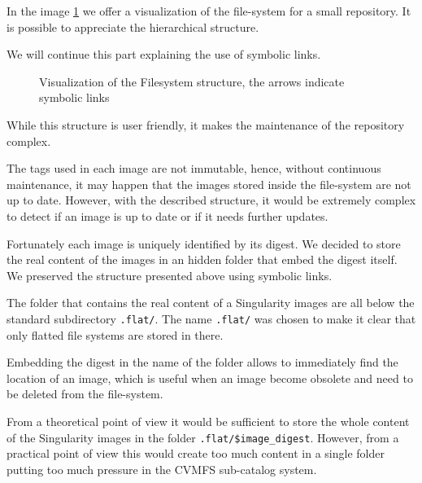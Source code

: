 In the image \ref{fig:simple-fs} we offer a visualization of the file-system for a small repository. It is possible to appreciate the hierarchical structure.

We will continue this part explaining the use of symbolic links.

\begin{figure}
\caption{Visualization of the Filesystem structure, the arrows indicate symbolic links}
\label{fig:simple-fs}
\end{figure}

While this structure is user friendly, it makes the maintenance of the repository complex.

The tags used in each image are not immutable, hence, without continuous maintenance, it may happen that the images stored inside the file-system are not up to date.
However, with the described structure, it would be extremely complex to detect if an image is up to date or if it needs further updates.

Fortunately each image is uniquely identified by its digest.
We decided to store the real content of the images in an hidden folder that embed the digest itself. 
We preserved the structure presented above using symbolic links.

The folder that contains the real content of a Singularity images are all below the standard subdirectory \texttt{.flat/}.
The name \texttt{.flat/} was chosen to make it clear that only flatted file systems are stored in there.

Embedding the digest in the name of the folder allows to immediately find the location of an image, which is useful when an image become obsolete and need to be deleted from the file-system.

From a theoretical point of view it would be sufficient to store the whole content of the Singularity images in the folder \texttt{.flat/\$image\_digest}.
However, from a practical point of view this would create too much content in a single folder putting too much pressure in the CVMFS sub-catalog system.

